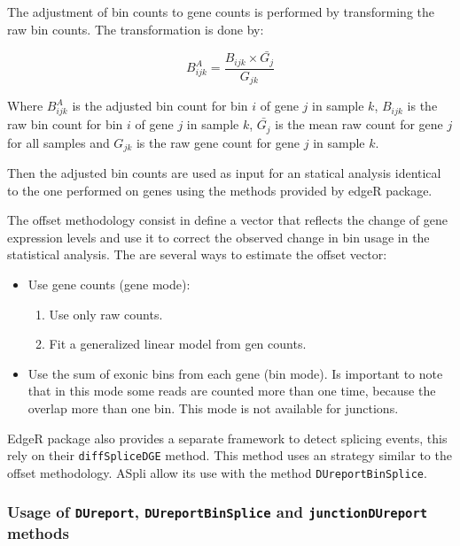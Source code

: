 \documentclass{article}
\begin{document}
The adjustment of bin counts to gene counts is performed by transforming the
raw bin counts. The transformation is done by:

\begin{equation}
  B^{A}_{ijk} = \frac{ B_{ijk} \times \bar{G_{j}} } { G_{jk} }
\end{equation}

Where $B^{A}_{ijk}$ is the adjusted bin count for bin $i$ of gene $j$ in sample
$k$, $B_{ijk}$ is the raw bin count for bin $i$ of gene $j$ in sample $k$, 
$\bar{G_{j}}$ is the mean raw count for gene $j$ for all samples and $G_{jk}$ is
the raw gene count for gene $j$ in sample $k$.

Then the adjusted bin counts are used as input for an statical analysis
identical to the one performed on genes using the methods provided by edgeR
package.

The offset methodology consist in define a vector that reflects the change of
gene expression levels and use it to correct the observed change in bin usage
in the statistical analysis.
The are several ways to estimate the offset vector:

\begin{itemize}
  \item Use gene counts (gene mode):
  \begin{enumerate}
     \item Use only raw counts.
     \item Fit a generalized linear model from gen counts.	
  \end{enumerate}
  \item Use the sum of exonic bins from each gene (bin mode). Is important to
  note that in this mode some reads are counted more than one time, because the
  overlap more than one bin. This mode is not available for junctions.
\end{itemize}

EdgeR package also provides a separate framework to detect splicing events, this
rely on their \texttt{diffSpliceDGE} method. This method uses an strategy
similar to the offset methodology. ASpli allow its use with the method
\texttt{DUreportBinSplice}.


\subsubsection{Usage of \texttt{DUreport}, \texttt{DUreportBinSplice} and
\texttt{junctionDUreport} methods }
\end{document}
